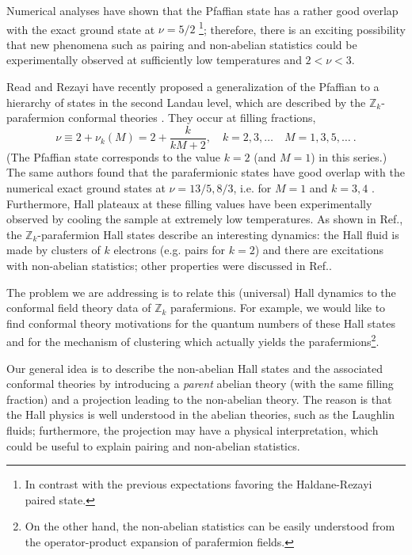 \documentclass[a4paper,12pt]{article}
\newcommand{\beq}{\begin{equation}}
\newcommand{\eeq}{\end{equation}}
\def \Z {{\mathbb Z}}
\begin{document}
Numerical analyses have shown that the Pfaffian
state has a rather good overlap with the exact ground state
at $\nu=5/2$ \cite{killhr}\footnote{
In contrast with the previous expectations
favoring the Haldane-Rezayi paired state.};
therefore, there is an exciting possibility that
new phenomena such as pairing and non-abelian statistics
could be experimentally observed 
at sufficiently low temperatures and $2 <\nu <3$.

Read and Rezayi have recently proposed \cite{rr} a generalization of
the Pfaffian to a hierarchy of states in the second
Landau level, which are described by the $\Z_k$-parafermion
conformal theories \cite{zf}. They occur at filling fractions,
\beq\label{0.1}
\nu \equiv 2 + \nu_k(M) = 2+ \frac{k}{kM+2}, \quad k=2,3,\ldots
\quad M=1,3,5,\dots \ .
\eeq
(The Pfaffian state corresponds to the value $k=2$ (and $M=1$) in this series.)
The same authors found that the parafermionic states have good 
overlap with the numerical exact ground states at $\nu=13/5, 8/3$, i.e.
for $M=1$ and $k=3,4$ \cite{rr}.
Furthermore, Hall plateaux at these filling values have been 
experimentally observed \cite{exper} by cooling the sample
at extremely low temperatures.
As shown in Ref.\cite{rr}, the $\Z_k$-parafermion Hall states 
describe an interesting dynamics: the
Hall fluid is made by clusters of $k$ electrons (e.g. pairs for $k=2$) 
and there are excitations with non-abelian statistics; other 
properties were discussed in Ref.\cite{gura}.

The problem we are addressing is to relate this (universal)
Hall dynamics to the conformal field theory data of $\Z_k$ parafermions.
For example, we would like to find conformal theory motivations
for the quantum numbers of these Hall states and for the
mechanism of clustering which actually yields the 
parafermions\footnote{
On the other hand, the non-abelian statistics can be
easily understood from the operator-product expansion
of parafermion fields.}.

Our general idea is to describe the non-abelian Hall states and
the associated conformal theories by introducing a {\it parent} abelian theory
(with the same filling fraction) and a projection leading to
the non-abelian theory.
The reason is that the Hall physics is well understood
in the abelian theories, such as the Laughlin fluids; 
furthermore, the projection may have a
physical interpretation, which could be useful to explain
pairing and non-abelian statistics.
\end{document}

